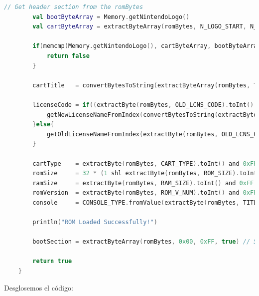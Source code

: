 \begin{lstlisting}[language=Kotlin, caption={Carga de ROM y manejo de errores durante el proceso.}, label={code:kotlinloadromread}]
        // Get header section from the romBytes
        val bootByteArray = Memory.getNintendoLogo()
        val cartByteArray = extractByteArray(romBytes, N_LOGO_START, N_LOGO_END, true) // Nintendo Logo on Cartridge goes from 0x104 to 0x133

        if(memcmp(Memory.getNintendoLogo(), cartByteArray, bootByteArray.size) != 0){
            return false
        }

        cartTitle   = convertBytesToString(extractByteArray(romBytes, TITLE_START, TITLE_END, true))

        licenseCode = if((extractByte(romBytes, OLD_LCNS_CODE).toInt() and 0xFF) == NEW_LICENSE_CODE){
            getNewLicenseNameFromIndex(convertBytesToString(extractByteArray(romBytes, LCNS_CODE_START, LCNS_CODE_END, true)))
        }else{
            getOldLicenseNameFromIndex(extractByte(romBytes, OLD_LCNS_CODE).toInt() and 0xFF)
        }

        cartType    = extractByte(romBytes, CART_TYPE).toInt() and 0xFF
        romSize     = 32 * (1 shl extractByte(romBytes, ROM_SIZE).toInt() and 0xFF) // Value in KiB
        ramSize     = extractByte(romBytes, RAM_SIZE).toInt() and 0xFF
        romVersion  = extractByte(romBytes, ROM_V_NUM).toInt() and 0xFF
        console     = CONSOLE_TYPE.fromValue(extractByte(romBytes, TITLE_END).toInt() and 0xFF)

        println("ROM Loaded Successfully!")

        bootSection = extractByteArray(romBytes, 0x00, 0xFF, true) // Save portion of code where the boot is going to load

        return true
    }
\end{lstlisting}

Desglosemos el código:

